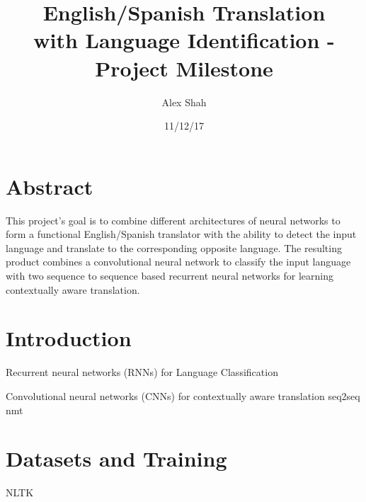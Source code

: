 \documentclass[10pt,a4paper]{report}
\begin{document}
\title{English/Spanish Translation \\ with Language Identification - \\ Project Milestone}
\author{Alex Shah}
\date{11/12/17}

\maketitle
\clearpage

\section{Abstract}
This project's goal is to combine different architectures of neural networks to form a functional English/Spanish translator with the ability to detect the input language and translate to the corresponding opposite language. The resulting product combines a convolutional neural network to classify the input language with two sequence to sequence based recurrent neural networks for learning contextually aware translation.

\section{Introduction}
Recurrent neural networks (RNNs) for Language Classification

Convolutional neural networks (CNNs) for contextually aware translation
	seq2seq
	nmt
	

\section{Datasets and Training}
NLTK
\end{document}
